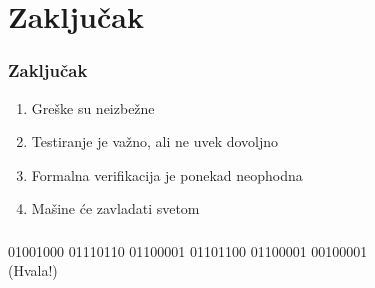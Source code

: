 \documentclass{beamer}
\begin{document}
\section{Zaključak}
\begin{frame}
\frametitle{Zaključak}
\begin{enumerate}
\item Greške su neizbežne
\item Testiranje je važno, ali ne uvek dovoljno
\item Formalna verifikacija je ponekad neophodna
\item Mašine će zavladati svetom
\end{enumerate}
\end{frame}

\begin{frame}
\frametitle{}
\begin{center}
{\Huge 01001000 01110110 01100001 01101100 01100001 00100001} \\
{\Huge (Hvala!)}
\end{center}
\end{frame}
\end{document}
